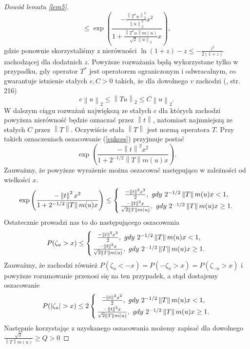\documentclass{mwart}
\newcommand{\norm}[1]{\left\lVert#1\right\rVert}
\begin{document}
\begin{proof}[Dowód lematu \ref{lem5}]
\begin{displaymath}
\end{displaymath}
\begin{equation}\label{sukces}
\leq \exp\left(\frac{-\frac{\norm{T^*u}_2^2}{\norm{u}^2_2}x^2}{1+\frac{\norm{T^*u}m(u)}{\sqrt{2}\norm{u}_2}x}\right),
\end{equation}
gdzie ponownie skorzystaliśmy z nierówności $\ln (1+z)-z\leq -\frac{z^2}{2(1+z)}$ zachodzącej dla dodatnich $z$.
Powyższe rozważania będą wykorzystane tylko w przypadku, gdy operator $T^*$ jest operatorem ograniczonym i odwracalnym, co gwarantuje istnienie stałych $c,C>0$ takich, że dla dowolnego $v$ zachodzi (\cite{sobolev}, str. 216)
\begin{displaymath}
c\norm{u}_2\leq \norm{Tu}_2\leq C\norm{u}_2.
\end{displaymath}
W dalszym ciągu rozważań największą ze stałych $c$ dla których zachodzi powyższa nierówność będzie oznaczać przez $\norm{t}$, natomiast najmniejszą ze stałych $C$ przez $\norm{T}$. Oczywiście stała $\norm{T}$ jest normą operatora $T$. Przy takich oznaczeniach oszacowanie (\ref{sukces}) przyjmuje postać 
\begin{displaymath}
\exp\left(\frac{-\norm{t}^2x^2}{1+2^{-1/2}\norm{T}m(u)x}\right).
\end{displaymath}
Zauważmy, że powyższe wyrażenie można oszacować następująco w zależności od wielkości $x$.
\begin{displaymath}
\exp\left(\frac{-\norm{t}^2x^2}{1+2^{-1/2}\norm{T}m(u)x}\right)\leq \left\{{\frac{-\norm{t}^2x^2}{2},\ gdy\ 2^{-1/2}\norm{T}m(u)x<1,}\atop {\frac{-\norm{t}^2x}{\sqrt{2}\norm{T}m(u)}},\ gdy\ 2^{-1/2}\norm{T}m(u)x\geq 1.\right.
\end{displaymath}
Ostatecznie prowadzi nas to do następującego oszacowania
\begin{displaymath}
P(\zeta_u>x)\leq \left\{{\frac{-\norm{t}^2x^2}{2},\ gdy\ 2^{-1/2}\norm{T}m(u)x<1,}\atop {\frac{-\norm{t}^2x}{\sqrt{2}\norm{T}m(u)}},\ gdy\ 2^{-1/2}\norm{T}m(u)x\geq 1.\right.
\end{displaymath}
Zauważmy, że zachodzi również $P(\zeta_u <-x)=P(-\zeta_u>x)=P(\zeta_{-u}>x)$ i powyższe rozumowanie przenosi się na ten przypadek, a stąd dostajemy oszacowanie 
\begin{displaymath}
P(|\zeta_u|>x)\leq 2\left\{{\frac{-\norm{t}^2x^2}{2},\ gdy\ 2^{-1/2}\norm{T}m(u)x<1,}\atop {\frac{-\norm{t}^2x}{\sqrt{2}\norm{T}m(u)}},\ gdy\ 2^{-1/2}\norm{T}m(u)x\geq 1.\right.
\end{displaymath}
Następnie korzystając z uzyskanego oszacowania możemy zapisać dla dowolnego $\frac{\sqrt{2}}{\norm{T}m(u)}\geq Q>0$

\end{proof}
\end{document}
